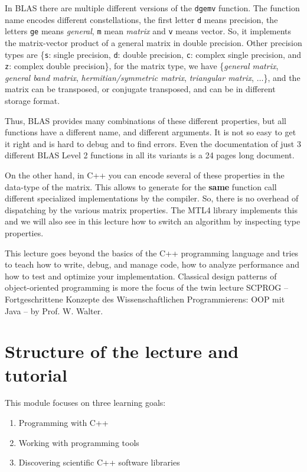 \begin{rem}
  In BLAS there are multiple different versions of the \texttt{dgemv} function. The function name encodes different constellations, \ie
  the first letter \texttt{d} means  precision, the letters \texttt{ge} means \emph{general}, \texttt{m} mean \emph{matrix}
  and \texttt{v} means vector. So, it implements the matrix-vector product of a general matrix in double precision. Other precision
  types are \{\texttt{s}: single precision, \texttt{d}: double precision, \texttt{c}: complex single precision, and \texttt{z}: complex
  double precision\}, for the matrix type, we have \{\emph{general matrix}, \emph{general band matrix}, \emph{hermitian/symmetric matrix},
  \emph{triangular matrix}, $\ldots$\}, and the matrix can be transposed, or conjugate transposed, and can be in different storage format.

  Thus, BLAS provides many combinations of these different properties, but all functions have a different name, and different arguments. It
  is not so easy to get it right and is hard to debug and to find errors. Even the documentation of just 3 different BLAS Level 2 functions
  in all its variants is a 24 pages long document.

  On the other hand, in C++ you can encode several of these properties in the data-type of the matrix. This allows to generate for the \textbf{same}
  function call different specialized implementations by the compiler. So, there is no overhead of dispatching by the various matrix properties.
  The MTL4 library implements this and we will also see in this lecture how to switch an algorithm by inspecting type properties.
\end{rem}

This lecture goes beyond the basics of the C++ programming language and tries to teach how to write, debug, and manage code, how to analyze
performance and how to test and optimize your implementation. Classical design patterns of object-oriented programming is more the focus of
the twin lecture SCPROG -- Fortgeschrittene Konzepte des Wissenschaftlichen Programmierens: OOP mit Java -- by Prof. W. Walter.


\section{Structure of the lecture and tutorial}
This module focuses on three learning goals:
\begin{enumerate}[1)]
  \item Programming with C++
  \item Working with programming tools
  \item Discovering scientific C++ software libraries
\end{enumerate}


